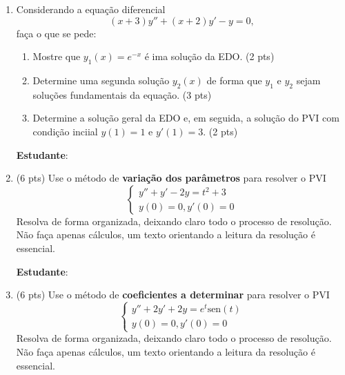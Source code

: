\documentclass[a4paper,11pt]{report}
\newcommand{\sen}{\textrm{sen}}
\begin{document}
\begin{enumerate}
    \item Considerando a equação diferencial
    \[
    (x+3)y'' + (x+2)y' - y = 0,
    \]
    faça o que se pede:
    \begin{enumerate}
        \item Mostre que $y_1(x)=e^{-x}$ é ima solução da EDO. (2 pts)
        \item Determine uma segunda solução $y_2(x)$ de forma que $y_1$ e $y_2$ sejam soluções fundamentais da equação. (3 pts)
        \item Determine a solução geral da EDO e, em seguida, a solução do PVI com condição inciial $y(1)=1$ e $y'(1)=3$. (2 pts)
    \end{enumerate}
    \newpage
    \textbf{Estudante}:\underline{\hspace{10cm}}

    \item  (6 pts) Use o método de \textbf{variação dos parâmetros} para resolver o PVI
    \[
    \begin{cases}
        y'' + y' - 2y = t^2 + 3\\
        y(0)=0, y'(0)=0
    \end{cases}
    \]
    Resolva de forma organizada, deixando claro todo o processo de resolução. Não faça apenas cálculos, um texto orientando a leitura da resolução é essencial.
    
    \newpage
    \textbf{Estudante}:\underline{\hspace{10cm}}
    \item (6 pts) Use o método de \textbf{coeficientes a determinar} para resolver o PVI
    \[
    \begin{cases}
        y'' + 2y' + 2y = e^t\sen(t)\\
        y(0)=0, y'(0)=0
    \end{cases}
    \]
    Resolva de forma organizada, deixando claro todo o processo de resolução. Não faça apenas cálculos, um texto orientando a leitura da resolução é essencial.
    
\end{enumerate}
\end{document}

